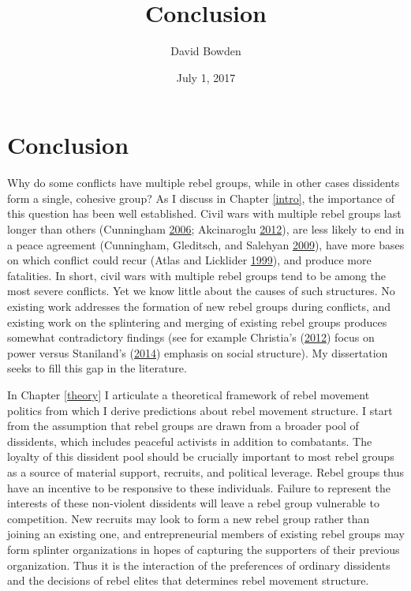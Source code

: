 \documentclass[12pt,]{book}
\title{Conclusion}
\author{David Bowden}
\date{July 1, 2017}
\theoremstyle{definition}
\theoremstyle{definition}
\theoremstyle{remark}
\begin{document}
\maketitle

\doublespacing

\mainmatter

\chapter{Conclusion}\label{conclusion}

Why do some conflicts have multiple rebel groups, while in other cases
dissidents form a single, cohesive group? As I discuss in Chapter
\ref{intro}, the importance of this question has been well established.
Civil wars with multiple rebel groups last longer than others
(Cunningham \protect\hyperlink{ref-Cunningham2006}{2006}; Akcinaroglu
\protect\hyperlink{ref-Akcinaroglu2012}{2012}), are less likely to end
in a peace agreement (Cunningham, Gleditsch, and Salehyan
\protect\hyperlink{ref-Cunningham2009}{2009}), have more bases on which
conflict could recur (Atlas and Licklider
\protect\hyperlink{ref-Atlas1999}{1999}), and produce more fatalities.
In short, civil wars with multiple rebel groups tend to be among the
most severe conflicts. Yet we know little about the causes of such
structures. No existing work addresses the formation of new rebel groups
during conflicts, and existing work on the splintering and merging of
existing rebel groups produces somewhat contradictory findings (see for
example Christia's (\protect\hyperlink{ref-Christia2012}{2012}) focus on
power versus Staniland's (\protect\hyperlink{ref-Staniland2014}{2014})
emphasis on social structure). My dissertation seeks to fill this gap in
the literature.

In Chapter \ref{theory} I articulate a theoretical framework of rebel
movement politics from which I derive predictions about rebel movement
structure. I start from the assumption that rebel groups are drawn from
a broader pool of dissidents, which includes peaceful activists in
addition to combatants. The loyalty of this dissident pool should be
crucially important to most rebel groups as a source of material
support, recruits, and political leverage. Rebel groups thus have an
incentive to be responsive to these individuals. Failure to represent
the interests of these non-violent dissidents will leave a rebel group
vulnerable to competition. New recruits may look to form a new rebel
group rather than joining an existing one, and entrepreneurial members
of existing rebel groups may form splinter organizations in hopes of
capturing the supporters of their previous organization. Thus it is the
interaction of the preferences of ordinary dissidents and the decisions
of rebel elites that determines rebel movement structure.
\end{document}
